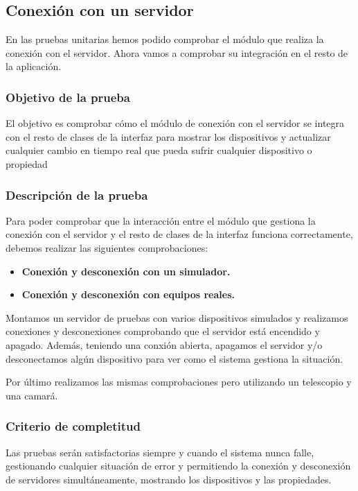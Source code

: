 \subsection{Conexión con un servidor}

En las pruebas unitarias hemos podido comprobar el módulo que realiza la conexión con el servidor. Ahora vamos a comprobar su integración en el resto de la aplicación.


\subsubsection{Objetivo de la prueba}

El objetivo es comprobar cómo el módulo de conexión con el servidor se integra con el resto de clases de la interfaz para mostrar los dispositivos y actualizar cualquier cambio en tiempo real que pueda sufrir cualquier dispositivo o propiedad

\subsubsection{Descripción de la prueba}

Para poder comprobar que la interacción entre el módulo que gestiona la conexión con el servidor y el resto de clases de la interfaz funciona correctamente, debemos realizar las siguientes comprobaciones:

\begin{itemize}
  \item \textbf{Conexión y desconexión con un simulador.}
  \item \textbf{Conexión y desconexión con equipos reales.}
\end{itemize}

Montamos un servidor de pruebas con varios dispositivos simulados y realizamos conexiones y desconexiones comprobando que el servidor está encendido y apagado. Además, teniendo una conxión abierta, apagamos el servidor y/o desconectamos algún dispositivo para ver como el sistema gestiona la situación.

\bigskip
Por último realizamos las mismas comprobaciones pero utilizando un telescopio y una camará.

\subsubsection{Criterio de completitud}

Las pruebas serán satisfactorias siempre y cuando el sistema nunca falle, gestionando cualquier situación de error y permitiendo la conexión y desconexión de servidores simultáneamente, mostrando los dispositivos y las propiedades.


